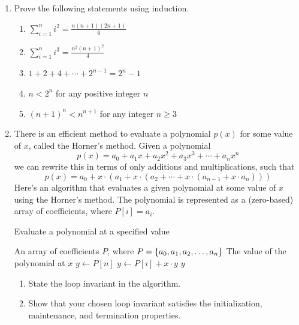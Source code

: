 \begin{exercises}
    \begin{enumerate}
        \item Prove the following statements using induction.
            \begin{enumerate}
                \item $\displaystyle\sum_{i=1}^n i^2 = \frac{n\left(n+1\right)\left(2n+1\right)}{6}$
                \item $\displaystyle\sum_{i=1}^n i^3 = \frac{n^2 \left(n+1\right)^2}{4}$
                \item $1 + 2 + 4 + \cdots + 2^{n-1} = 2^n - 1$
                \item $n < 2^n$ for any positive integer $n$
                \item $\left(n+1\right)^n < n^{n+1}$ for any integer $n \ge 3$
            \end{enumerate}

        \item There is an efficient method to evaluate a polynomial $p\left(x\right)$ for some value of $x$, called the Horner's method. Given a polynomial
            \[
                p\left(x\right) = a_0 + a_1 x + a_2 x^2 + a_3 x^3 + \cdots + a_n x^n
            \]
        we can rewrite this in terms of only additions and multiplications, such that
        \[
            p\left(x\right) = a_0 + x\cdot\left(a_1 + x\cdot\left(a_2 + \cdots + x\cdot\left(a_{n-1} + x\cdot a_n\right)\right)\right)
        \]
        Here's an algorithm that evaluates a given polynomial at some value of $x$ using the Horner's method. The polynomial is represented as a (zero-based) array of coefficients, where $P[i] = a_i$.
        \begin{algorithm}[H]
            \caption{Evaluate a polynomial at a specified value}
            \begin{algorithmic}[1]
                \Require An array of coefficients $P$, where $P = \left\{a_0, a_1, a_2, \ldots, a_n\right\}$
                \Ensure The value of the polynomial at $x$
                    \State $y \gets P[n]$
                        \State $y \gets P[i] + x\cdot y$
                    \EndFor
                    \Return $y$
                \EndFunction
            \end{algorithmic}
        \end{algorithm}

        \begin{enumerate}
            \item State the loop invariant in the algorithm.
            \item Show that your chosen loop invariant satisfies the initialization, maintenance, and termination properties.
        \end{enumerate}


\end{enumerate}
\end{exercises}
